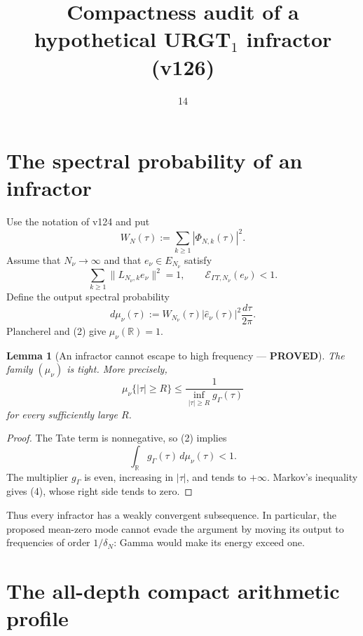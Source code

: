 \documentclass[11pt]{article}
\title{Compactness audit of a hypothetical URGT$_1$ infractor (v126)}
\date{14}
\newcommand{\PROVED}{\textcolor{green!40!black}{\textbf{PROVED}}}
\newtheorem{lemma}{Lemma}
\begin{document}
\maketitle

\section{The spectral probability of an infractor}

Use the notation of v124 and put
\begin{equation}
 W_N(\tau):=\sum_{k\ge1}|\Phi_{N,k}(\tau)|^2.              \tag{1}
\end{equation}
Assume that $N_\nu\to\infty$ and that $e_\nu\in E_{N_\nu}$ satisfy
\begin{equation}
 \sum_{k\ge1}\|L_{N_\nu,k}e_\nu\|^2=1,
 \qquad
 \mathcal E_{\Gamma T,N_\nu}(e_\nu)<1.                  \tag{2}
\end{equation}
Define the output spectral probability
\begin{equation}
 d\mu_\nu(\tau)
 :=W_{N_\nu}(\tau)|\widehat e_\nu(\tau)|^2
       \frac{d\tau}{2\pi}.                               \tag{3}
\end{equation}
Plancherel and (2) give $\mu_\nu(\mathbb R)=1$.

\begin{lemma}[An infractor cannot escape to high frequency --- \PROVED]
The family $(\mu_\nu)$ is tight.  More precisely,
\begin{equation}
 \mu_\nu\{|\tau|\ge R\}
 \le\frac1{\inf_{|\tau|\ge R}g_\Gamma(\tau)}             \tag{4}
\end{equation}
for every sufficiently large $R$.
\end{lemma}

\begin{proof}
The Tate term is nonnegative, so (2) implies
\[
 \int_{\mathbb R}g_\Gamma(\tau)\,d\mu_\nu(\tau)<1.
\]
The multiplier $g_\Gamma$ is even, increasing in $|\tau|$, and tends to
$+\infty$.  Markov's inequality gives (4), whose right side tends to zero.
\end{proof}

Thus every infractor has a weakly convergent subsequence.  In particular,
the proposed mean-zero mode cannot evade the argument by moving its output
to frequencies of order $1/\delta_N$: Gamma would make its energy exceed
one.

\section{The all-depth compact arithmetic profile}
\end{document}
